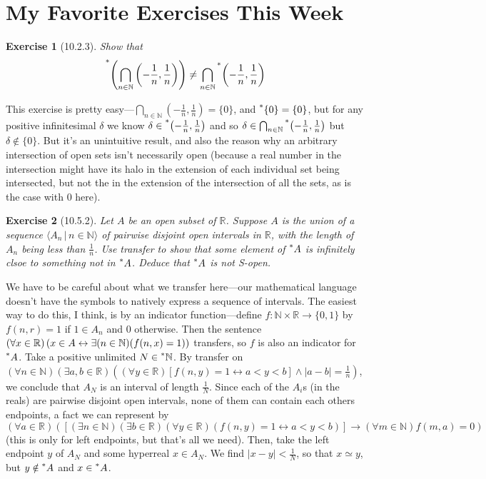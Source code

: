 \documentclass{article}
\newcommand{\reals}{\mathbb{R}}
\newcommand{\nats}{\mathbb{N}}
\newcommand{\hnats}{\prescript{*}{}{\mathbb{N}}}
\newcommand{\hr}[1]{\prescript{*}{}{#1}}
\newtheorem*{exercise}{Exercise}
\begin{document}
\section*{My Favorite Exercises This Week}
\begin{exercise}[10.2.3]
    Show that \[\hr{\left(\bigcap_{n \in \nats}\left(-\frac{1}{n}, \frac{1}{n}\right)\right)} \neq \bigcap_{n \in \nats}\hr{\left(-\frac{1}{n}, \frac{1}{n}\right)}\]
\end{exercise}
This exercise is pretty easy---$\bigcap_{n \in \nats} (-\frac{1}{n}, \frac{1}{n}) = \{0\}$, and $\hr\{0\} = \{0\}$, but for any positive infinitesimal $\delta$ we know $\delta \in \hr{\left(-\frac{1}{n}, \frac{1}{n}\right)}$ and so $\delta \in \bigcap_{n \in \nats}\hr{\left(-\frac{1}{n}, \frac{1}{n}\right)}$ but $\delta \notin \{0\}$. But it's an unintuitive result, and also the reason why an arbitrary intersection of open sets isn't necessarily open (because a real number in the intersection might have its halo in the extension of each individual set being intersected, but not the in the extension of the intersection of all the sets, as is the case with $0$ here).

\begin{exercise}[10.5.2]
    Let $A$ be an open subset of $\reals$. Suppose $A$ is the union of a sequence $\langle A_n \,|\, n \in \nats \rangle$ of pairwise disjoint open intervals in $\reals$, with the length of $A_n$ being less than $\frac{1}{n}$. Use transfer to show that some element of $\hr{A}$ is infinitely clsoe to something not in $\hr{A}$. Deduce that $\hr{A}$ is not S-open.
\end{exercise}
We have to be careful about what we transfer here---our mathematical language doesn't have the symbols to natively express a sequence of intervals. The easiest way to do this, I think, is by an indicator function---define $f: \nats \times \reals \to \{0, 1\}$ by $f(n, r) = 1$ if $1 \in A_n$ and $0$ otherwise. Then the sentence $(\forall x \in \reals) \left(x \in A \leftrightarrow \\\exists (n \in \nats) (f(n, x) = 1)\right)$ transfers, so $f$ is also an indicator for $\hr{A}$. Take a positive unlimited $N \in \hnats$. By transfer on $(\forall n \in \nats) (\exists a, b \in \reals) \left((\forall y \in \reals) [f(n, y) = 1 \leftrightarrow a < y < b] \land |a-b| = \frac{1}{n}\right)$, we conclude that $A_N$ is an interval of length $\frac{1}{N}$. Since each of the $A_i$s (in the reals) are pairwise disjoint open intervals, none of them can contain each others endpoints, a fact we can represent by $(\forall a \in \reals) \left([(\exists n \in \nats) (\exists b \in \reals) (\forall y \in \reals) (f(n, y) = 1 \leftrightarrow a < y < b)] \rightarrow (\forall m \in \nats) f(m, a) = 0\right)$ (this is only for left endpoints, but that's all we need). Then, take the left endpoint $y$ of $A_N$ and some hyperreal $x \in A_N$. We find $|x - y| < \frac{1}{N}$, so that $x \simeq y$, but $y \notin \hr{A}$ and $x \in \hr{A}$.
\end{document}
